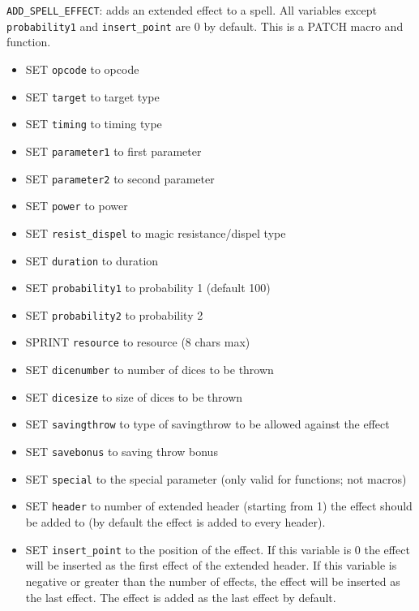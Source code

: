 \documentclass{article}
\begin{document}
\verb+ADD_SPELL_EFFECT+: adds an extended effect to a spell. All variables except \verb+probability1+ and \verb+insert_point+ are 0 by default.
This is a PATCH macro and function.
\begin{itemize}
\item SET \verb+opcode+ to opcode
\item SET \verb+target+ to target type
\item SET \verb+timing+ to timing type
\item SET \verb+parameter1+ to first parameter
\item SET \verb+parameter2+ to second parameter
\item SET \verb+power+ to power
\item SET \verb+resist_dispel+ to magic resistance/dispel type
\item SET \verb+duration+ to duration
\item SET \verb+probability1+ to probability 1 (default 100)
\item SET \verb+probability2+ to probability 2
\item SPRINT \verb+resource+ to resource (8 chars max)
\item SET \verb+dicenumber+ to number of dices to be thrown
\item SET \verb+dicesize+ to size of dices to be thrown
\item SET \verb+savingthrow+ to type of savingthrow to be allowed against the effect
\item SET \verb+savebonus+ to saving throw bonus
\item SET \verb+special+ to the special parameter (only valid for functions; not macros)
\item SET \verb+header+ to number of extended header (starting from 1) the effect should be added to (by default the effect is added to every header).
\item SET \verb+insert_point+ to the position of the effect. If this variable is 0 the effect will be inserted as the first effect of the extended header. If this variable is negative or greater than the number of effects, the effect will be inserted as the last effect. The effect is added as the last effect by default.
\end{itemize}
\end{document}
